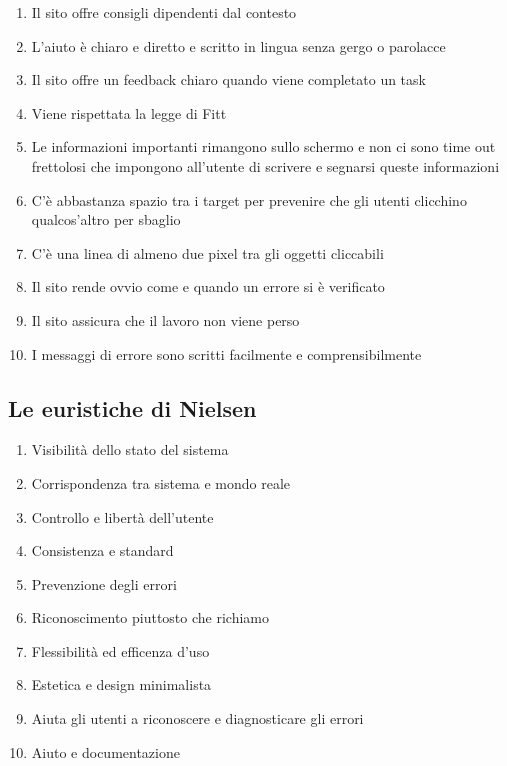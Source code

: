 \documentclass[../Report.tex]{subfiles}
\begin{document}
\begin{enumerate}
        \item Il sito offre consigli dipendenti dal contesto 
        \item L’aiuto è chiaro e diretto e scritto in lingua senza gergo o parolacce
        \item Il sito offre un feedback chiaro quando viene completato un task
        \item Viene rispettata la legge di Fitt
        \item Le informazioni importanti rimangono sullo schermo e non ci sono time out frettolosi che impongono all’utente di scrivere e segnarsi queste informazioni 
        \item C’è abbastanza spazio tra i target per prevenire che gli utenti clicchino qualcos’altro per sbaglio 
        \item C’è una linea di almeno due pixel tra gli oggetti cliccabili 
        \item Il sito rende ovvio come e quando un errore si è verificato 
        \item Il sito assicura che il lavoro non viene perso 
        \item I messaggi di errore sono scritti facilmente e comprensibilmente
        
    \end{enumerate}

    \subsection{Le euristiche di Nielsen }
    \begin{enumerate}
        \item Visibilità dello stato del sistema 
        \item Corrispondenza tra sistema e mondo reale
        \item Controllo e libertà dell’utente 
        \item Consistenza e standard
        \item Prevenzione degli errori 
        \item Riconoscimento piuttosto che richiamo 
        \item Flessibilità ed efficenza d’uso 
        \item Estetica e design minimalista
        \item Aiuta gli utenti a riconoscere e diagnosticare gli errori 
        \item Aiuto e documentazione
        
    \end{enumerate}
    
\end{document}

